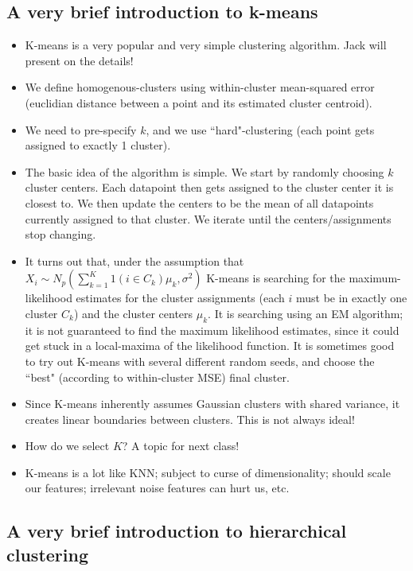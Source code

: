 \subsection{A very brief introduction to k-means}
\begin{itemize}
\item K-means is a very popular and very simple clustering algorithm. Jack will present on the details! 	
\item We define homogenous-clusters using within-cluster mean-squared error (euclidian distance between a point and its estimated cluster centroid).
\item We need to pre-specify $k$, and we use ``hard"-clustering (each point gets assigned to exactly 1 cluster). 
\item The basic idea of the algorithm is simple. We start by randomly choosing $k$ cluster centers. Each datapoint then gets assigned to the cluster center it is closest to. We then update the centers to be the mean of all datapoints currently assigned to that cluster. We iterate until the centers/assignments stop changing. 
\item It turns out that, under the assumption that $X_{i} \sim N_p\left( \sum_{k=1}^K 1(i \in C_k) \mu_{k}, \sigma^2 \right)$ K-means is searching for the maximum-likelihood estimates for the cluster assignments (each $i$ must be in exactly one cluster $C_k$) and the cluster centers $\mu_k$. It is searching using an EM algorithm; it is not guaranteed to find the maximum likelihood estimates, since it could get stuck in a local-maxima of the likelihood function. It is sometimes good to try out K-means with several different random seeds, and choose the ``best" (according to within-cluster MSE) final cluster. 
\item Since K-means inherently assumes Gaussian clusters with shared variance, it creates linear boundaries between clusters. This is not always ideal! 
\item How do we select $K$? A topic for next class!
\item K-means is a lot like KNN; subject to curse of dimensionality; should scale our features; irrelevant noise features can hurt us, etc.
\end{itemize}



\subsection{A very brief introduction to hierarchical clustering}

